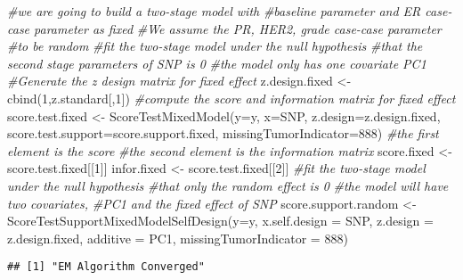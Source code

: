 \documentclass[11pt,]{article}
\newenvironment{Shaded}{\begin{snugshade}}{\end{snugshade}}
\newcommand{\AttributeTok}[1]{\textcolor[rgb]{0.77,0.63,0.00}{#1}}
\newcommand{\CommentTok}[1]{\textcolor[rgb]{0.56,0.35,0.01}{\textit{#1}}}
\newcommand{\DecValTok}[1]{\textcolor[rgb]{0.00,0.00,0.81}{#1}}
\newcommand{\FunctionTok}[1]{\textcolor[rgb]{0.00,0.00,0.00}{#1}}
\newcommand{\NormalTok}[1]{#1}
\newcommand{\OtherTok}[1]{\textcolor[rgb]{0.56,0.35,0.01}{#1}}
\begin{document}
\begin{Shaded}
\begin{Highlighting}[]
\CommentTok{\#we are going to build a two{-}stage model with }
\CommentTok{\#baseline parameter and ER case{-}case parameter as fixed}
\CommentTok{\#We assume the PR, HER2, grade case{-}case parameter }
\CommentTok{\#to be random}
\CommentTok{\#fit the two{-}stage model under the null hypothesis}
\CommentTok{\#that the second stage parameters of SNP is 0}
\CommentTok{\#the model only has one covariate PC1}
\CommentTok{\#Generate the z design matrix for fixed effect}
\NormalTok{z.design.fixed }\OtherTok{\textless{}{-}} \FunctionTok{cbind}\NormalTok{(}\DecValTok{1}\NormalTok{,z.standard[,}\DecValTok{1}\NormalTok{])}
\CommentTok{\#compute the score and information matrix for fixed effect}
\NormalTok{score.test.fixed }\OtherTok{\textless{}{-}} \FunctionTok{ScoreTestMixedModel}\NormalTok{(}\AttributeTok{y=}\NormalTok{y,}
                    \AttributeTok{x=}\NormalTok{SNP,}
                    \AttributeTok{z.design=}\NormalTok{z.design.fixed,}
                    \AttributeTok{score.test.support=}\NormalTok{score.support.fixed,}
                    \AttributeTok{missingTumorIndicator=}\DecValTok{888}\NormalTok{)}
\CommentTok{\#the first element is the score}
\CommentTok{\#the second element is the information matrix}
\NormalTok{score.fixed }\OtherTok{\textless{}{-}}\NormalTok{ score.test.fixed[[}\DecValTok{1}\NormalTok{]]}
\NormalTok{infor.fixed }\OtherTok{\textless{}{-}}\NormalTok{ score.test.fixed[[}\DecValTok{2}\NormalTok{]]}
\CommentTok{\#fit the two{-}stage model under the null hypothesis}
\CommentTok{\#that only the random effect is 0}
\CommentTok{\#the model will have two covariates, }
\CommentTok{\#PC1 and the fixed effect of SNP}
\NormalTok{score.support.random }\OtherTok{\textless{}{-}} \FunctionTok{ScoreTestSupportMixedModelSelfDesign}\NormalTok{(}\AttributeTok{y=}\NormalTok{y,}
                        \AttributeTok{x.self.design  =}\NormalTok{ SNP,}
                        \AttributeTok{z.design =}\NormalTok{ z.design.fixed,}
                        \AttributeTok{additive =}\NormalTok{ PC1,}
                        \AttributeTok{missingTumorIndicator =} \DecValTok{888}\NormalTok{)}
\end{Highlighting}
\end{Shaded}

\begin{verbatim}
## [1] "EM Algorithm Converged"
\end{verbatim}
\end{document}
